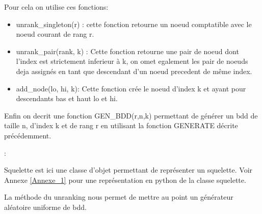 \documentclass[french]{article}
\begin{document}
Pour cela on utilise ces fonctions:
\begin{itemize}
    \item unrank\_singleton(r) : cette fonction retourne un noeud comptatible avec le noeud courant de rang r.
    \item unrank\_pair(rank, k) : Cette fonction retourne une pair de noeud dont l'index est strictement inferieur à k, on omet egalement les pair de noeuds deja assignés en tant que descendant d'un noeud precedent de même index.
    
    \item add\_node(lo, hi, k): Cette fonction crée le noeud d'index k et ayant pour descendants bas et haut lo et hi.
\end{itemize}

\newpage
Enfin on decrit une fonction GEN\_BDD(r,n,k) permettant de générer un bdd de taille n, d'index k et de rang r en utilisant la fonction GENERATE décrite précédemment.

\begin{algorithm}
  \begin{algorithmic}[1]
    \Statex
            \State {}
            \State {}
            \State {}
            \State {}
            \State {}
                \State {}
                :
                    \State {}
                    \State {}
                    \State {}
            \EndFor
  \end{algorithmic}
\end{algorithm}

Squelette est ici une classe d'objet permettant de représenter un squelette. Voir Annexe \ref{Annexe_1} pour une représentation en python de la classe squelette.

La méthode du unranking nous permet de mettre au point un générateur aléatoire uniforme de bdd.
\end{document}
